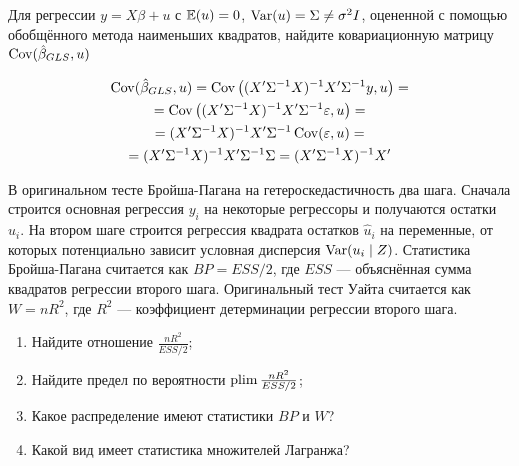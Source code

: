 \begin{problem}
Для регрессии $y = X\beta + u$ с $\operatorname{\mathbb E}(u) = 0$, $\operatorname{Var}(u) = \Sigma \neq \sigma^2 I$, оцененной с помощью обобщённого метода наименьших квадратов, найдите ковариационную матрицу $\operatorname{Cov}(\hat{\beta}_{GLS}, u)$



\begin{sol}
\begin{multline*}
\operatorname{Cov}(\hat{\beta}_{GLS}, u) = \operatorname{Cov} \left( (X' \Sigma^{-1} X)^{-1} X' \Sigma^{-1} y, u \right) = \\
= \operatorname{Cov} \left( (X' \Sigma^{-1} X)^{-1} X' \Sigma^{-1} \varepsilon, u \right) = \\
= (X' \Sigma^{-1} X)^{-1} X' \Sigma^{-1} \operatorname{Cov}(\varepsilon, u) =\\
= (X' \Sigma^{-1} X)^{-1} X' \Sigma^{-1} \Sigma = (X' \Sigma^{-1} X)^{-1} X'
\end{multline*}
\end{sol}
\end{problem}


\begin{problem}
В оригинальном тесте Бройша-Пагана на гетероскедастичность два шага. Сначала строится основная регрессия $y_i$ на некоторые регрессоры и получаются остатки $\hat u_i$. На втором шаге строится регрессия квадрата остатков $\hat u_i$ на переменные, от которых потенциально зависит условная дисперсия $\operatorname{Var}(u_i \mid Z)$. Статистика Бройша-Пагана считается как $BP=ESS/2$, где $ESS$ — объяснённая сумма квадратов регрессии второго шага. Оригинальный тест Уайта считается как $W=nR^2$, где $R^2$ — коэффициент детерминации регрессии второго шага.
\begin{enumerate}
  \item Найдите отношение $\frac{nR^2}{ESS/2}$;
  \item Найдите предел по вероятности $\operatorname*{plim} \frac{nR^2}{ESS/2}$;
  \item Какое распределение имеют статистики $BP$ и $W$?
  \item Какой вид имеет статистика множителей Лагранжа?
\end{enumerate}


\begin{sol}

  \end{sol}
\end{problem}





